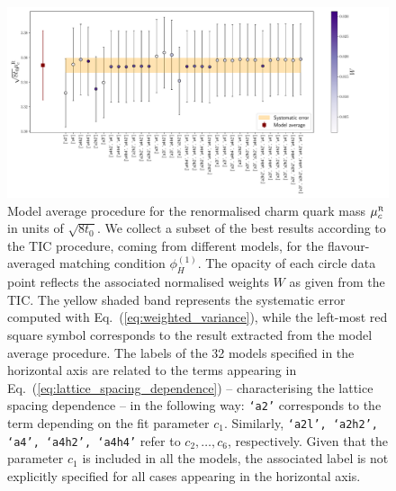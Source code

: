 \begin{figure}[!htb]
	\centering
	\includegraphics[scale=0.42]{./cap6/figs/mc/cat_ave_tot_muc_fl_ave.pdf}
	\caption{Model average procedure for the renormalised charm quark mass $\mu_c^{\rm\scriptscriptstyle R}$ in units of $\sqrt{8t_0}$. We collect a subset of the best results according to the TIC procedure, coming from different models, for the flavour-averaged  matching condition $\phi_H^{(1)}$.   The opacity of each circle data point reflects the associated normalised weights $W$ as given from the TIC. The yellow shaded band represents the systematic error computed with Eq.~(\ref{eq:weighted_variance}), while the left-most red square symbol corresponds to the result extracted from the model average procedure. The labels of the 32 models specified in the horizontal axis are related to the terms appearing in Eq.~(\ref{eq:lattice_spacing_dependence}) -- characterising the lattice spacing dependence -- in the following way: \texttt{`a2'} corresponds to the term depending on the fit parameter $c_1$. Similarly, \texttt{`a2l', `a2h2', `a4', `a4h2', `a4h4'} refer to $c_2,\dots, c_6$, respectively. Given that the parameter $c_1$ is included in all the models, the associated label is not explicitly specified for all cases appearing in the horizontal axis.}
	\label{fig:mc_model_av_summary}
\end{figure}

